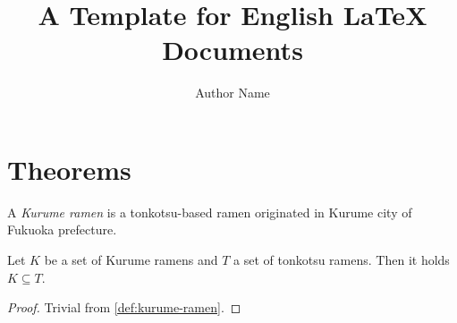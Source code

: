 \documentclass[a4paper, 11pt]{article}
\title{A Template for English LaTeX Documents}
\author{Author Name}
\begin{document}
\maketitle


\section{Theorems}

\begin{theorem} \label{def:kurume-ramen}
  A \emph{Kurume ramen} is a tonkotsu-based ramen originated in Kurume city of Fukuoka prefecture.
\end{theorem}

\begin{theorem} \label{thm:pi}
  Let $K$ be a set of Kurume ramens and $T$ a set of tonkotsu ramens.
  Then it holds $K \subseteq T$.
\end{theorem}

\begin{proof}
  Trivial from \cref{def:kurume-ramen}.
\end{proof}





\end{document}
